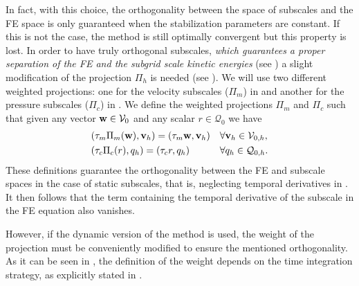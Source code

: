 In fact, with this choice, the orthogonality between the space of subscales and the FE space is only guaranteed when the stabilization parameters are constant. If this is not the case, the method is still optimally convergent \cite{Codina_2008a} but this property is lost. In order to have truly orthogonal subscales, \emph{which guarantees a proper separation of the FE and the subgrid scale kinetic energies} (see ) a slight modification of the projection $\Pi_h$ is needed (see \cite{Codina_2008a}). We will use two different weighted projections: one for the velocity subscales ($\Pi_m$) in  and another for the pressure subscales ($\Pi_c$) in . We define the weighted projections $\Pi_m$ and $\Pi_c$ such that given any vector ${\bf w}\in\mathcal{V}_0$ and any scalar $r\in\mathcal{Q}_0$ we have
\begin{align}
\label{eq-C2_Pi_tau_m}
&(\tau_m\Pi_m({\bf w}),{\bf v}_h)=(\tau_m{\bf w},{\bf v}_h)&&\forall{\bf v}_h\in\mathcal{V}_{0,h},\\
\label{eq-C2_Pi_tau_c}
&(\tau_c\Pi_c(r),q_h)=(\tau_cr,q_h)&&\forall q_h\in\mathcal{Q}_{0,h}.
\end{align}
These definitions guarantee the orthogonality between the FE and subscale spaces in the case of static subscales, that is, neglecting temporal derivatives in . It then follows that the term containing the temporal derivative of the subscale in the FE equation  also vanishes.

However, if the dynamic version of the method is used, the weight of the projection  must be conveniently modified to ensure the mentioned orthogonality. As it can be seen in , the definition of the weight depends on the time integration strategy, as explicitly stated in .